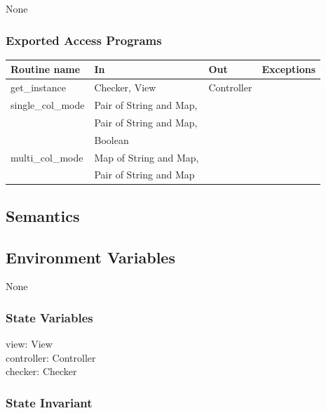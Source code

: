 \documentclass[12pt]{article}
\begin{document}
None

\subsubsection* {Exported Access Programs}

\begin{tabular}{| l | l | l | p{4.7cm} |}
\hline
\textbf{Routine name} & \textbf{In} & \textbf{Out} & \textbf{Exceptions}\\
\hline
get\_instance & Checker, View & Controller & \\
\hline
single\_col\_mode & Pair of String and Map, & &\\
                  & Pair of String and Map, & &\\
                  & Boolean & & \\
\hline
multi\_col\_mode & Map of String and Map, & &\\
                  & Pair of String and Map & & \\
\hline

\end{tabular}

\subsection* {Semantics}

\subsection*{Environment Variables}

None

\subsubsection* {State Variables}

view: View \\
controller: Controller\\
checker: Checker

\subsubsection* {State Invariant}
\end{document}
